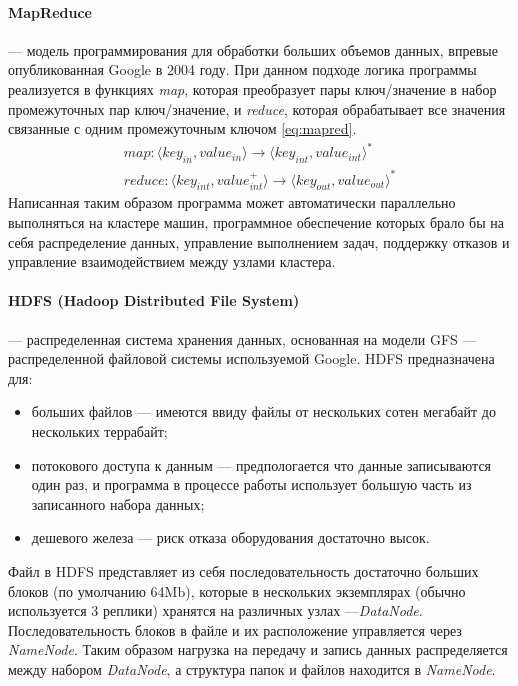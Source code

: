 \paragraph{MapReduce} --- модель программирования для обработки больших объемов данных, впревые опубликованная\cite{googlemr} Google в 2004 году. При данном подходе логика программы реализуется в функциях \textit{map}, которая преобразует пары ключ/значение в набор промежуточных пар ключ/значение, и \textit{reduce}, которая обрабатывает все значения связанные с одним промежуточным ключом \ref{eq:mapred}.
\begin{equation}\label{eq:mapred}
\begin{split}
map:\langle key_{in}, value_{in}\rangle\rightarrow\langle key_{int}, value_{int}\rangle^{*} \\
reduce:\langle key_{int}, value_{int}^{+}\rangle\rightarrow\langle key_{out}, value_{out}\rangle^{*}
\end{split}
\end{equation}
Написанная таким образом программа может автоматически параллельно выполняться на кластере машин, программное обеспечение которых брало бы на себя распределение данных, управление выполнением задач, поддержку отказов и управление взаимодействием между узлами кластера. 
\paragraph{HDFS (Hadoop Distributed File System)} --- распределенная система хранения данных, основанная на модели GFS\cite{gfs} --- распределенной файловой системы используемой Google. HDFS предназначена для:
\begin{itemize}
 \item больших файлов --- имеются ввиду файлы от нескольких сотен мегабайт до нескольких террабайт;
 \item потокового доступа к данным --- предпологается что данные записываются один раз, и программа в процессе работы использует большую часть из записанного набора данных;
 \item дешевого железа --- риск отказа оборудования достаточно высок.
\end{itemize}
Файл в HDFS представляет из себя последовательность достаточно больших блоков (по умолчанию 64Mb), которые в нескольких экземплярах (обычно используется 3 реплики) хранятся на различных узлах ---\textit{DataNode}. Последовательность блоков в файле и их расположение управляется через \textit{NameNode}. Таким образом нагрузка на передачу и запись данных распределяется между набором \textit{DataNode}, а структура папок и файлов находится в \textit{NameNode}.

